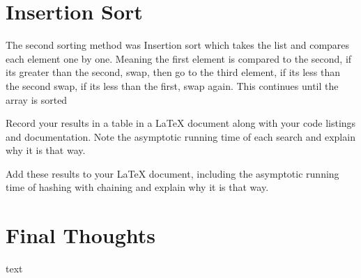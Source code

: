 \documentclass[12pt, letterpaper]{article}
\begin{document}
\section{Insertion Sort} \label{Insertion}
The second sorting method was Insertion sort which takes the list and compares each element one by one. 
Meaning the first element is compared to the second, if its greater than the second, swap, then go to the third element, if its less 
than the second swap, if its less than the first, swap again. This continues until the array is sorted

Record	your	results	in	a	table	in	a	LaTeX	document	along	with	your	
code	listings	and	documentation.	Note	the	asymptotic	running	time	
of	each	search	and	explain	why	it	is	that	way.


Add	these	results	to	your	LaTeX	document,	including	the	asymptotic	
running	time	of	hashing	with	chaining	and	explain	why	it	is	that	
way.

\section{Final Thoughts} \label{Final}
text
\end{document}
